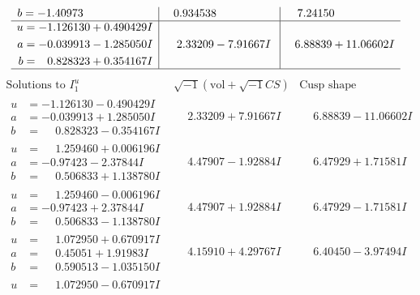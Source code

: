 \documentclass[1p]{elsarticle_modified}
\theoremstyle{definition}
\newcommand{\I}{\sqrt{-1}}
\begin{document}
$$\begin{array}{c|c|c}
\begin{aligned}
b &= -1.40973\phantom{ +0.000000I}\end{aligned}
 & \phantom{-}0.934538\phantom{ +0.000000I} & \phantom{-}7.24150\phantom{ +0.000000I} \\ \hline\begin{aligned}
u &= -1.126130 + 0.490429 I \\
a &= -0.039913 - 1.285050 I \\
b &= \phantom{-}0.828323 + 0.354167 I\end{aligned}
 & \phantom{-}2.33209 - 7.91667 I & \phantom{-}6.88839 + 11.06602 I\\
 \hline 
 \end{array}$$\newpage$$\begin{array}{c|c|c}  
\text{Solutions to }I^u_{1}& \I (\text{vol} + \sqrt{-1}CS) & \text{Cusp shape}\\
 \hline 
\begin{aligned}
u &= -1.126130 - 0.490429 I \\
a &= -0.039913 + 1.285050 I \\
b &= \phantom{-}0.828323 - 0.354167 I\end{aligned}
 & \phantom{-}2.33209 + 7.91667 I & \phantom{-}6.88839 - 11.06602 I \\ \hline\begin{aligned}
u &= \phantom{-}1.259460 + 0.006196 I \\
a &= -0.97423 - 2.37844 I \\
b &= \phantom{-}0.506833 + 1.138780 I\end{aligned}
 & \phantom{-}4.47907 - 1.92884 I & \phantom{-}6.47929 + 1.71581 I \\ \hline\begin{aligned}
u &= \phantom{-}1.259460 - 0.006196 I \\
a &= -0.97423 + 2.37844 I \\
b &= \phantom{-}0.506833 - 1.138780 I\end{aligned}
 & \phantom{-}4.47907 + 1.92884 I & \phantom{-}6.47929 - 1.71581 I \\ \hline\begin{aligned}
u &= \phantom{-}1.072950 + 0.670917 I \\
a &= \phantom{-}0.45051 + 1.91983 I \\
b &= \phantom{-}0.590513 - 1.035150 I\end{aligned}
 & \phantom{-}4.15910 + 4.29767 I & \phantom{-}6.40450 - 3.97494 I \\ \hline\begin{aligned}
u &= \phantom{-}1.072950 - 0.670917 I \\

\end{aligned}
\end{array}$$
\end{document}
